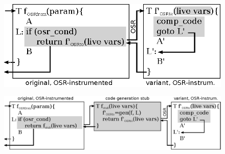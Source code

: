 \ifdefined\noauthorea
\begin{figure}[t]
\begin{center}
\includegraphics[width=0.7\columnwidth]{figures/overview-osr-final/overview-osr-final.eps}
\caption{\protect}
\end{center}
\end{figure}
\fi

\ifdefined\noauthorea
\begin{figure}[t]
\begin{center}
\includegraphics[width=1.0\columnwidth]{figures/overview-osr-open/overview-osr-open.eps}
\caption{\protect}
\end{center}
\end{figure}
\fi

  
  
  
  
  
  
  
  
  
  
  
  
  
  
  
  
  
  
  
  
  